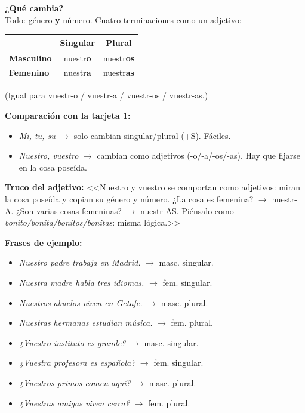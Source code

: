 \documentclass[a4paper,10pt]{article}
\begin{document}
\vspace{6pt}

\textbf{¿Qué cambia?}\\
Todo: género \textbf{y} número. Cuatro terminaciones como un adjetivo:

\vspace{4pt}
\begin{center}
\begin{tabular}{|l|c|c|}
\hline
\rowcolor{moradopos!15}
 & \textbf{Singular} & \textbf{Plural} \\
\hline
\textbf{Masculino} & nuestr\textbf{o} & nuestr\textbf{os} \\
\hline
\rowcolor{grisclaro}
\textbf{Femenino} & nuestr\textbf{a} & nuestr\textbf{as} \\
\hline
\end{tabular}
\end{center}

\vspace{2pt}
{\footnotesize (Igual para vuestr-o / vuestr-a / vuestr-os / vuestr-as.)}

\vspace{6pt}

\textbf{Comparación con la tarjeta 1:}
\begin{itemize}[nosep, leftmargin=1.2em]
\item \textit{Mi, tu, su} $\to$ solo cambian singular/plural (+S). Fáciles.
\item \textit{Nuestro, vuestro} $\to$ cambian como adjetivos (-o/-a/-os/-as). Hay que fijarse en la cosa poseída.
\end{itemize}

\begin{trucoposesivo}
\textbf{Truco del adjetivo:} <<Nuestro y vuestro se comportan como adjetivos: miran la cosa poseída y copian su género y número. ¿La cosa es femenina? $\to$ nuestr-A. ¿Son varias cosas femeninas? $\to$ nuestr-AS. Piénsalo como \textit{bonito/bonita/bonitos/bonitas}: misma lógica.>>
\end{trucoposesivo}

\textbf{Frases de ejemplo:}
\begin{itemize}[nosep, leftmargin=1.2em]
\item \textit{Nuestro padre trabaja en Madrid.} $\to$ masc. singular.
\item \textit{Nuestra madre habla tres idiomas.} $\to$ fem. singular.
\item \textit{Nuestros abuelos viven en Getafe.} $\to$ masc. plural.
\item \textit{Nuestras hermanas estudian música.} $\to$ fem. plural.
\item \textit{¿Vuestro instituto es grande?} $\to$ masc. singular.
\item \textit{¿Vuestra profesora es española?} $\to$ fem. singular.
\item \textit{¿Vuestros primos comen aquí?} $\to$ masc. plural.
\item \textit{¿Vuestras amigas viven cerca?} $\to$ fem. plural.
\end{itemize}
\end{document}
